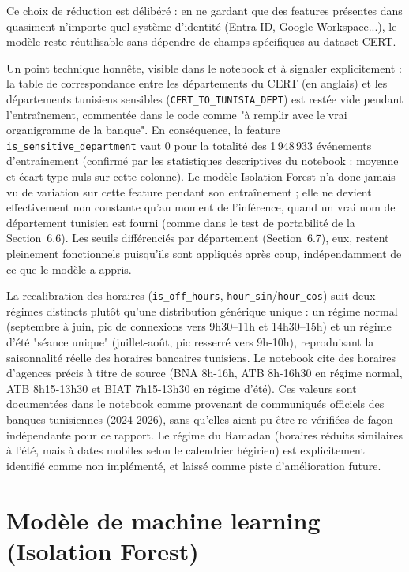 \documentclass[12pt,a4paper]{report}
\begin{document}
Ce choix de réduction est délibéré : en ne gardant que des features présentes dans quasiment n'importe quel système d'identité (Entra ID, Google Workspace...), le modèle reste réutilisable sans dépendre de champs spécifiques au dataset CERT.

Un point technique honnête, visible dans le notebook et à signaler explicitement : la table de correspondance entre les départements du CERT (en anglais) et les départements tunisiens sensibles (\texttt{CERT\_TO\_TUNISIA\_DEPT}) est restée vide pendant l'entraînement, commentée dans le code comme "à remplir avec le vrai organigramme de la banque". En conséquence, la feature \texttt{is\_sensitive\_department} vaut 0 pour la totalité des 1\,948\,933 événements d'entraînement (confirmé par les statistiques descriptives du notebook : moyenne et écart-type nuls sur cette colonne). Le modèle Isolation Forest n'a donc jamais vu de variation sur cette feature pendant son entraînement ; elle ne devient effectivement non constante qu'au moment de l'inférence, quand un vrai nom de département tunisien est fourni (comme dans le test de portabilité de la Section~6.6). Les seuils différenciés par département (Section~6.7), eux, restent pleinement fonctionnels puisqu'ils sont appliqués après coup, indépendamment de ce que le modèle a appris.

La recalibration des horaires (\texttt{is\_off\_hours}, \texttt{hour\_sin}/\texttt{hour\_cos}) suit deux régimes distincts plutôt qu'une distribution générique unique : un régime normal (septembre à juin, pic de connexions vers 9h30--11h et 14h30--15h) et un régime d'été "séance unique" (juillet-août, pic resserré vers 9h-10h), reproduisant la saisonnalité réelle des horaires bancaires tunisiens. Le notebook cite des horaires d'agences précis à titre de source (BNA 8h-16h, ATB 8h-16h30 en régime normal, ATB 8h15-13h30 et BIAT 7h15-13h30 en régime d'été). Ces valeurs sont documentées dans le notebook comme provenant de communiqués officiels des banques tunisiennes (2024-2026), sans qu'elles aient pu être re-vérifiées de façon indépendante pour ce rapport. Le régime du Ramadan (horaires réduits similaires à l'été, mais à dates mobiles selon le calendrier hégirien) est explicitement identifié comme non implémenté, et laissé comme piste d'amélioration future.

\section{Modèle de machine learning (Isolation Forest)}
\end{document}
